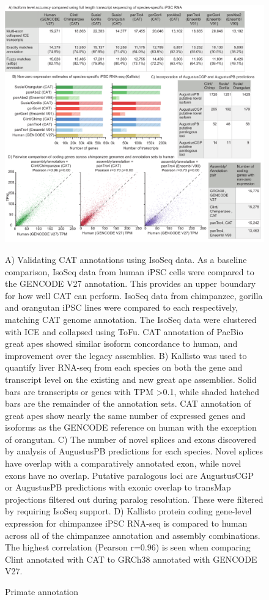 \documentclass[fleqn,10pt]{wlscirep}
\begin{document}
\begin{figure}
\centering
\includegraphics[width=\textwidth,height=\textheight,keepaspectratio]{figure2-primate_v8.pdf}
\caption{Primate annotation}
A) Validating CAT annotations using IsoSeq data. As a baseline comparison, IsoSeq data from human iPSC cells were compared to the GENCODE V27 annotation. This provides an upper boundary for how well CAT can perform. IsoSeq data from chimpanzee,  gorilla and orangutan iPSC lines were compared to each respectively, matching CAT genome annotation.  The IsoSeq data were clustered with ICE and collapsed using ToFu\cite{gordon2015widespread}. CAT annotation of PacBio great apes showed similar isoform concordance to human, and improvement over the legacy assemblies. B) Kallisto\cite{bray2015near} was used to quantify liver RNA-seq from each species on both the gene and transcript level on the existing and new great ape assemblies. Solid bars are transcripts or genes with TPM \textgreater 0.1, while shaded hatched bars are the remainder of the annotation sets. CAT annotation of great apes show nearly the same number of expressed genes and isoforms as the GENCODE reference on human with the exception of orangutan. C) The number of novel splices and exons discovered by analysis of AugustusPB predictions for each species. Novel splices have overlap with a comparatively annotated exon, while novel exons have no overlap. Putative paralogous loci are AugustusCGP or AugustusPB predictions with exonic overlap to transMap projections filtered out during paralog resolution. These were filtered by requiring IsoSeq support. D) Kallisto protein coding gene-level expression for chimpanzee iPSC RNA-seq is compared to human across all of the chimpanzee annotation and assembly combinations. The highest correlation (Pearson r=0.96) is seen when comparing Clint annotated with CAT to GRCh38 annotated with GENCODE V27.
\label{fig:fig2}
\end{figure}
\end{document}

